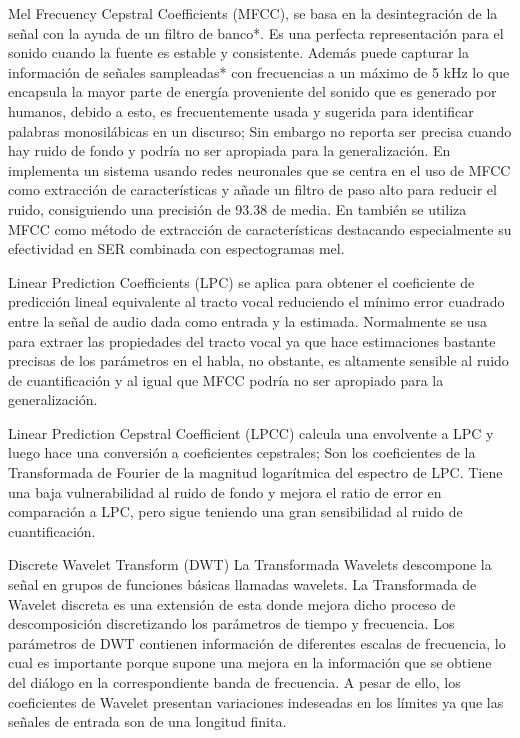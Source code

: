 \documentclass[11pt,a4paper,spanish]{book}
\begin{document}
	Mel Frecuency Cepstral Coefficients (MFCC), se basa en la desintegración de la señal con la ayuda de un filtro de banco*. Es una perfecta representación para el sonido cuando la fuente es estable y consistente. Además puede capturar la información de señales sampleadas* con frecuencias a un máximo de 5 kHz lo que encapsula la mayor parte de energía proveniente del sonido que es generado por humanos, debido a esto, es frecuentemente usada y sugerida para identificar palabras monosilábicas en un discurso; Sin embargo no reporta ser precisa cuando hay ruido de fondo y podría no ser apropiada para la generalización. En \cite{Sarkania2013} implementa un sistema usando redes neuronales que se centra en el uso de MFCC como extracción de características y añade un filtro  de paso alto para reducir el ruido, consiguiendo una precisión de 93.38 de media. En \cite{Wang2020} también se utiliza MFCC como método de extracción de características destacando especialmente su efectividad en SER combinada con espectogramas mel.
	
	Linear Prediction Coefficients (LPC) se aplica para obtener el coeficiente de predicción lineal equivalente al tracto vocal reduciendo el mínimo error cuadrado entre la señal de audio dada como entrada y la estimada. Normalmente se usa para extraer las propiedades del tracto vocal ya que hace estimaciones bastante precisas de los parámetros en el habla, no obstante, es altamente sensible al ruido de cuantificación y al igual que MFCC podría no ser apropiado para la generalización.
	
	Linear Prediction Cepstral Coefficient (LPCC) calcula una envolvente a LPC y luego hace una conversión a coeficientes cepstrales; Son los coeficientes de la Transformada de Fourier de la magnitud logarítmica del espectro de LPC. Tiene una baja vulnerabilidad al ruido de fondo y mejora el ratio de error en comparación a LPC, pero sigue teniendo una gran sensibilidad al ruido de cuantificación.
	
	Discrete Wavelet Transform (DWT) La Transformada Wavelets descompone la señal en grupos de funciones básicas llamadas wavelets. La Transformada de Wavelet discreta es una extensión de esta donde mejora dicho proceso de descomposición discretizando los parámetros de tiempo y frecuencia. Los parámetros de DWT contienen información de diferentes escalas de frecuencia, lo cual es importante porque supone una mejora en la información que se obtiene del diálogo en la correspondiente banda de frecuencia. A pesar de ello, los coeficientes de Wavelet presentan variaciones indeseadas en los límites ya que las señales de entrada son de una longitud finita.
	
\end{document}
